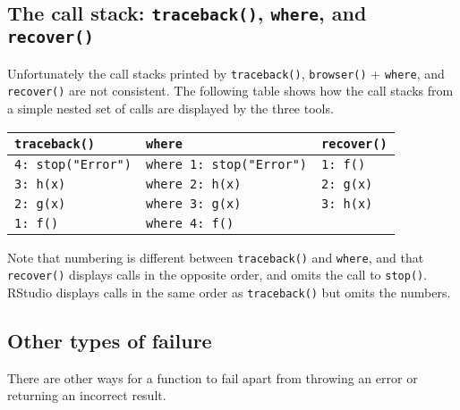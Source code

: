 \hypertarget{the-call-stack-traceback-where-and-recover}{%
\subsection{\texorpdfstring{The call stack: \texttt{traceback()},
\texttt{where}, and
\texttt{recover()}}{The call stack: traceback(), where, and recover()}}\label{the-call-stack-traceback-where-and-recover}}

Unfortunately the call stacks printed by \texttt{traceback()},
\texttt{browser()} + \texttt{where}, and \texttt{recover()} are not
consistent. The following table shows how the call stacks from a simple
nested set of calls are displayed by the three tools. 

\begin{longtable}[]{@{}lll@{}}
\toprule
\texttt{traceback()} & \texttt{where} &
\texttt{recover()}\tabularnewline
\midrule
\endhead
\texttt{4:\ stop("Error")} & \texttt{where\ 1:\ stop("Error")} &
\texttt{1:\ f()}\tabularnewline
\texttt{3:\ h(x)} & \texttt{where\ 2:\ h(x)} &
\texttt{2:\ g(x)}\tabularnewline
\texttt{2:\ g(x)} & \texttt{where\ 3:\ g(x)} &
\texttt{3:\ h(x)}\tabularnewline
\texttt{1:\ f()} & \texttt{where\ 4:\ f()} &\tabularnewline
\bottomrule
\end{longtable}

Note that numbering is different between \texttt{traceback()} and
\texttt{where}, and that \texttt{recover()} displays calls in the
opposite order, and omits the call to \texttt{stop()}. RStudio displays
calls in the same order as \texttt{traceback()} but omits the numbers.

\hypertarget{other-types-of-failure}{%
\subsection{Other types of failure}\label{other-types-of-failure}}

There are other ways for a function to fail apart from throwing an error
or returning an incorrect result.

